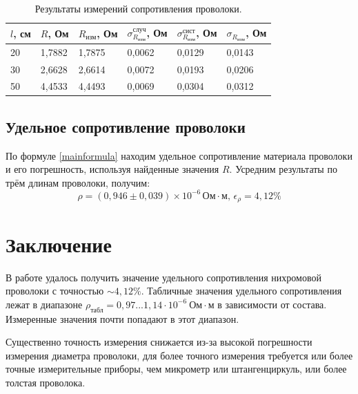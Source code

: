 \documentclass[a4paper, 12pt]{article}
\begin{document}
\begin{table}[tbp]
    \caption{Результаты измерений сопротивления проволоки.}
    \begin{tabular}{|l|l|l|l|l|l|}
    \hline
    $l$, см & $R$, Ом  & $R_\text{изм}$, Ом & $\sigma_{R_\text{изм}}^{\text{случ}}$, Ом & $\sigma_{R_\text{изм}}^{\text{сист}}$, Ом & $\sigma_{R_\text{изм}}$, Ом \\ \hline
    20      & 1{,}7882 & 1{,}7875           & 0{,}0062                                  & 0{,}0129                                  & 0{,}0143                    \\ \hline
    30      & 2{,}6628 & 2{,}6614           & 0{,}0072                                  & 0{,}0193                                  & 0{,}0206                    \\ \hline
    50      & 4{,}4533 & 4{,}4493           & 0{,}0069                                  & 0{,}0304                                  & 0{,}0312                    \\ \hline
    \end{tabular}
    \centering
    \label{tab:resistance}
\end{table}

\subsection{Удельное сопротивление проволоки}
По формуле \ref{mainformula} находим удельное сопротивление материала проволоки
и его погрешность, используя найденные значения $R$.
Усредним результаты по трём длинам проволоки, получим:
$$\rho = (0{,}946 \pm 0{,}039) \times 10^{-6} \, \text{Ом} \cdot \text{м, } \epsilon_\rho = 4{,}12\%$$

\section{Заключение}

В работе удалось получить значение удельного сопротивления нихромовой проволоки
с точностью $\sim4{,}12\%$. Табличные значения удельного сопротивления лежат в диапазоне 
$\rho_{\text{табл}}=0{,}97...1{,}14 \cdot 10^{-6}\ \text{Ом} \cdot \text{м}$ в зависимости от
состава. Измеренные значения почти попадают в этот диапазон.

Существенно точность измерения снижается из-за высокой погрешности измерения
диаметра проволоки, для более точного измерения требуется или более точные
измерительные приборы, чем микрометр или штангенциркуль, или более толстая
проволока.
\end{document}
